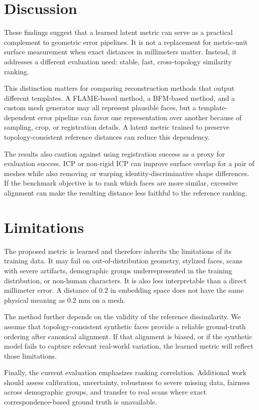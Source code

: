 \documentclass{article}
\begin{document}
\section{Discussion}

These findings suggest that a learned latent metric can serve as a practical complement to geometric error pipelines. It is not a replacement for metric-unit surface measurement when exact distances in millimeters matter. Instead, it addresses a different evaluation need: stable, fast, cross-topology similarity ranking.

This distinction matters for comparing reconstruction methods that output different templates. A FLAME-based method, a BFM-based method, and a custom mesh generator may all represent plausible faces, but a template-dependent error pipeline can favor one representation over another because of sampling, crop, or registration details. A latent metric trained to preserve topology-consistent reference distances can reduce this dependency.

The results also caution against using registration success as a proxy for evaluation success. ICP or non-rigid ICP can improve surface overlap for a pair of meshes while also removing or warping identity-discriminative shape differences. If the benchmark objective is to rank which faces are more similar, excessive alignment can make the resulting distance less faithful to the reference ranking.

\section{Limitations}

The proposed metric is learned and therefore inherits the limitations of its training data. It may fail on out-of-distribution geometry, stylized faces, scans with severe artifacts, demographic groups underrepresented in the training distribution, or non-human characters. It is also less interpretable than a direct millimeter error. A distance of $0.2$ in embedding space does not have the same physical meaning as $0.2$ mm on a mesh.

The method further depends on the validity of the reference dissimilarity. We assume that topology-consistent synthetic faces provide a reliable ground-truth ordering after canonical alignment. If that alignment is biased, or if the synthetic model fails to capture relevant real-world variation, the learned metric will reflect those limitations.

Finally, the current evaluation emphasizes ranking correlation. Additional work should assess calibration, uncertainty, robustness to severe missing data, fairness across demographic groups, and transfer to real scans where exact correspondence-based ground truth is unavailable.
\end{document}
